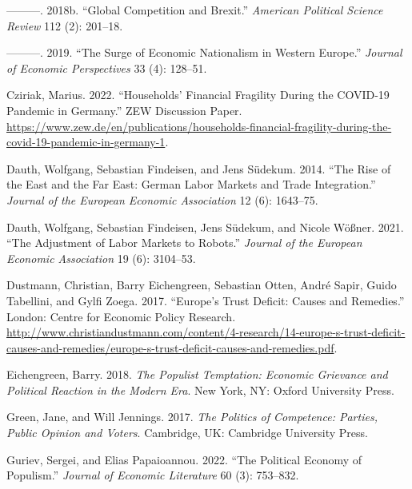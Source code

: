 \documentclass[
]{article}
\newlength{\cslhangindent}
\newlength{\cslentryspacingunit} %
\newenvironment{CSLReferences}[2] %
 {%
  \setlength{\parindent}{0pt}
  \ifodd #1
  \let\oldpar\par
  \def\par{\hangindent=\cslhangindent\oldpar}
  \fi
  \setlength{\parskip}{#2\cslentryspacingunit}
 }%
 {}
\begin{document}
\begin{CSLReferences}{1}{0}
\leavevmode{}%
---------. 2018b. {``Global {Competition} and {Brexit}.''}
\emph{American Political Science Review} 112 (2): 201--18.

\leavevmode{}%
---------. 2019. {``The {Surge} of {Economic} {Nationalism} in {Western}
{Europe}.''} \emph{Journal of Economic Perspectives} 33 (4): 128--51.

\leavevmode{}%
Cziriak, Marius. 2022. {``{Households}' {Financial} {Fragility} {During}
the {COVID}-19 {Pandemic} in {Germany}.''} {ZEW} {Discussion} {Paper}.
\url{https://www.zew.de/en/publications/households-financial-fragility-during-the-covid-19-pandemic-in-germany-1}.

\leavevmode{}%
Dauth, Wolfgang, Sebastian Findeisen, and Jens Südekum. 2014. {``The
{Rise} of the {East} and the {Far} {East}: {German} {Labor} {Markets}
and {Trade} {Integration}.''} \emph{Journal of the European Economic
Association} 12 (6): 1643--75.

\leavevmode{}%
Dauth, Wolfgang, Sebastian Findeisen, Jens Südekum, and Nicole Wößner.
2021. {``The {Adjustment} of {Labor} {Markets} to {Robots}.''}
\emph{Journal of the European Economic Association} 19 (6): 3104--53.

\leavevmode{}%
Dustmann, Christian, Barry Eichengreen, Sebastian Otten, André Sapir,
Guido Tabellini, and Gylfi Zoega. 2017. {``Europe's {Trust} {Deficit}:
{Causes} and {Remedies}.''} London: Centre for Economic Policy Research.
\url{http://www.christiandustmann.com/content/4-research/14-europe-s-trust-deficit-causes-and-remedies/europe-s-trust-deficit-causes-and-remedies.pdf}.

\leavevmode{}%
Eichengreen, Barry. 2018. \emph{The {Populist} {Temptation}: {Economic}
{Grievance} and {Political} {Reaction} in the {Modern} {Era}}. New York,
NY: Oxford University Press.

\leavevmode{}%
Green, Jane, and Will Jennings. 2017. \emph{The {Politics} of
{Competence}: {Parties}, {Public} {Opinion} and {Voters}}. Cambridge,
UK: Cambridge University Press.

\leavevmode{}%
Guriev, Sergei, and Elias Papaioannou. 2022. {``The {Political}
{Economy} of {Populism}.''} \emph{Journal of Economic Literature} 60
(3): 753--832.


\end{CSLReferences}
\end{document}
